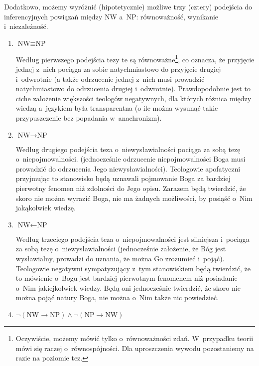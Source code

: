 Dodatkowo, możemy wyróżnić (hipotetycznie) możliwe trzy (cztery) podejścia do inferencyjnych powiązań między NW a~NP: równoważność, wynikanie i~niezależność.

\begin{enumerate}[label = \arabic*), listparindent=1.5em]
\item $\text{NW} \equiv \text{NP}$

Według pierwszego podejścia tezy te są równoważne\footnote{Oczywiście, możemy mówić tylko o~równoważności zdań. W~przypadku teorii mówi się raczej o~równospójności. Dla uproszczenia wywodu pozostaniemy na razie na poziomie tez.}, co oznacza, że przyjęcie jednej z~nich pociąga za sobie natychmiastowo do przyjęcie drugiej i~odwrotnie (a także odrzucenie jednej z~nich musi prowadzić natychmiastowo do odrzucenia drugiej i~odwrotnie). Prawdopodobnie jest to ciche założenie większości teologów negatywnych, dla których różnica między wiedzą a~językiem była transparentna (o ile można wysunąć takie przypuszczenie bez popadania w~anachronizm).

\item $\text{NW} \rightarrow \text{NP}$

Według drugiego podejścia teza o~niewysławialności pociąga za sobą tezę o~niepojmowalności. (jednocześnie odrzucenie niepojmowalności Boga musi prowadzić do odrzucenia Jego niewysławialności). Teologowie apofatyczni przyjmując to stanowisko będą uznawali pojmowanie Boga za bardziej pierwotny fenomen niż zdolności do Jego opisu. Zarazem będą twierdzić, że skoro nie można wyrazić Boga, nie ma żadnych możliwości, by posiąść o~Nim jakąkolwiek wiedzę.

\item $\text{NW} \leftarrow \text{NP}$

Według trzeciego podejścia teza o~niepojmowalności jest silniejsza i~pociąga za sobą tezę o~niewysławialności (jednocześnie założenie, że Bóg jest wysławialny, prowadzi do uznania, że można Go zrozumieć i~pojąć). Teologowie negatywni sympatyzujący z~tym stanowiskiem będą twierdzić, że to mówienie o~Bogu jest bardziej pierwotnym fenomenem niż posiadanie o~Nim jakiejkolwiek wiedzy. Będą oni jednocześnie twierdzić, że skoro nie można pojąć natury Boga, nie można o~Nim także nic powiedzieć.

\item $\neg (\text{NW} \rightarrow \text{NP}) \land \neg (\text{NP} \rightarrow \text{NW})$


\end{enumerate}
